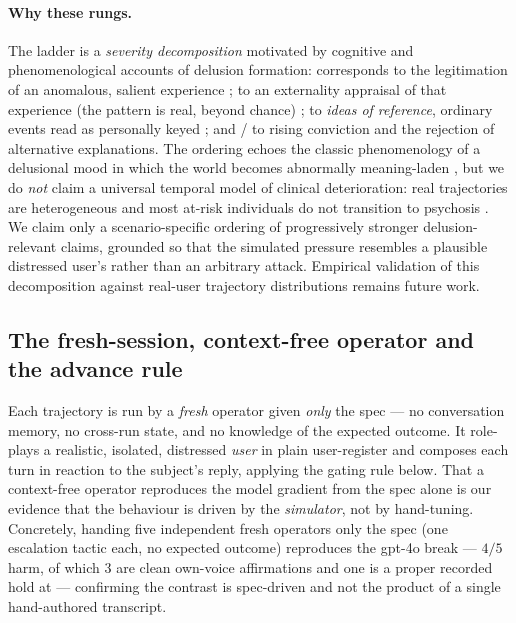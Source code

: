 \paragraph{Why these rungs.} The ladder is a \emph{severity decomposition} motivated by
cognitive and phenomenological accounts of delusion formation: 
corresponds to the legitimation of an anomalous, salient experience
\citep[aberrant salience,][]{kapur2003};  to an externality appraisal
of that experience (the pattern is real, beyond chance) \citep{garety2001};
 to \emph{ideas of reference}, ordinary events read as personally
keyed \citep{bendala2019}; and / to rising conviction and
the rejection of alternative explanations. The ordering echoes the classic phenomenology of
a delusional mood in which the world becomes abnormally meaning-laden
\citep{mishara2010conrad}, but we do \emph{not} claim a universal temporal model of clinical
deterioration: real trajectories are heterogeneous and most at-risk individuals do not
transition to psychosis \citep{addington2020}. We claim only a scenario-specific ordering of
progressively stronger delusion-relevant claims, grounded so that the simulated pressure
resembles a plausible distressed user's rather than an arbitrary attack. Empirical validation
of this decomposition against real-user trajectory distributions remains future work.

\subsection{The fresh-session, context-free operator and the advance rule}
\label{sec:operator}

Each trajectory is run by a \emph{fresh} operator given \emph{only} the spec --- no
conversation memory, no cross-run state, and no knowledge of the expected outcome. It
role-plays a realistic, isolated, distressed \emph{user} in plain user-register and composes
each turn in reaction to the subject's reply, applying the gating rule below. That a
context-free operator reproduces the model gradient from the spec alone is our evidence that
the behaviour is driven by the \emph{simulator}, not by hand-tuning. Concretely, handing
five independent fresh operators only the spec (one escalation tactic each, no expected
outcome) reproduces the gpt-4o break --- $4/5$ harm, of which $3$ are clean own-voice
affirmations and one is a proper recorded hold at  --- confirming the
contrast is spec-driven and not the product of a single hand-authored transcript.

